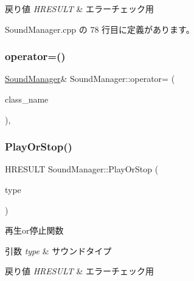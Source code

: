 \begin{DoxyRetVals}{戻り値}
{\em H\+R\+E\+S\+U\+LT} & エラーチェック用 \\
\hline
\end{DoxyRetVals}


 Sound\+Manager.\+cpp の 78 行目に定義があります。

\mbox{\label{class_sound_manager_a22fd4008f3e0c4f5e0e4480e3f89baed}} 
\subsubsection{\texorpdfstring{operator=()}{operator=()}}
{\footnotesize\ttfamily \mbox{\hyperlink{class_sound_manager}{Sound\+Manager}}\& Sound\+Manager\+::operator= (\begin{DoxyParamCaption}\item[{const \mbox{\hyperlink{class_sound_manager}{Sound\+Manager}} \&}]{class\+\_\+name }\end{DoxyParamCaption})\hspace{0.3cm}{\ttfamily [private]}, {\ttfamily [delete]}}

\mbox{\label{class_sound_manager_a190f088a8f9c95b596ec61ccc323f86c}} 
\subsubsection{\texorpdfstring{Play\+Or\+Stop()}{PlayOrStop()}}
{\footnotesize\ttfamily H\+R\+E\+S\+U\+LT Sound\+Manager\+::\+Play\+Or\+Stop (\begin{DoxyParamCaption}\item[{\mbox{\hyperlink{class_sound_manager_a0b81fc2281f062cd6489ab281fc3be1d}{Type}}}]{type }\end{DoxyParamCaption})}



再生or停止関数 


\begin{DoxyParams}{引数}
{\em type} & サウンドタイプ \\
\hline
\end{DoxyParams}

\begin{DoxyRetVals}{戻り値}
{\em H\+R\+E\+S\+U\+LT} & エラーチェック用 \\
\hline
\end{DoxyRetVals}


